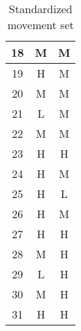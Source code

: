 \begin{table}[h]
\begin{subtable}
\begin{tabular}[t]{||c|c|c||}
      \hline
      18 & M & M \\
      \hline
      19 & H & M \\
      \hline
      20 & M & M \\
      \hline
      21 & L & M \\
      \hline
      22 & M & M \\
      \hline
      23 & H & H \\
      \hline
      24 & H & M \\
      \hline
      25 & H & L \\
      \hline
      26 & H & M \\
      \hline
      27 & H & H \\
      \hline
      28 & M & H \\
      \hline
      29 & L & H \\
      \hline
      30 & M & H \\
      \hline
      31 & H & H \\
      \hline
    \end{tabular}
    \end{subtable}
    \caption{Standardized movement set}
    \label{fig: standardized movement set}
\end{table}
